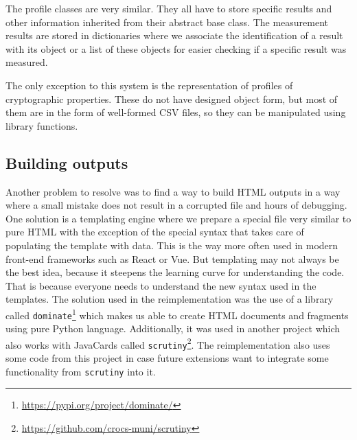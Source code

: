 The profile classes are very similar. They all have to store specific results and other information inherited from their abstract base class. The measurement results are stored in dictionaries where we associate the identification of a result with its object or a list of these objects for easier checking if a specific result was measured.

The only exception to this system is the representation of profiles of cryptographic properties. These do not have designed object form, but most of them are in the form of well-formed CSV files, so they can be manipulated using library functions.


\subsection{Building outputs}
Another problem to resolve was to find a way to build HTML outputs in a way where a small mistake does not result in a corrupted file and hours of debugging. One solution is a templating engine where we prepare a special file very similar to pure HTML with the exception of the special syntax that takes care of populating the template with data. This is the way more often used in modern front-end frameworks such as React or Vue. But templating may not always be the best idea, because it steepens the learning curve for understanding the code. That is because everyone needs to understand the new syntax used in the templates. The solution used in the reimplementation was the use of a library called \texttt{dominate}\footnote{\url{https://pypi.org/project/dominate/}} which makes us able to create HTML documents and fragments using pure Python language. Additionally, it was used in another project which also works with JavaCards called \texttt{scrutiny}\footnote{\url{https://github.com/crocs-muni/scrutiny}}. The reimplementation also uses some code from this project in case future extensions want to integrate some functionality from \texttt{scrutiny} into it.

